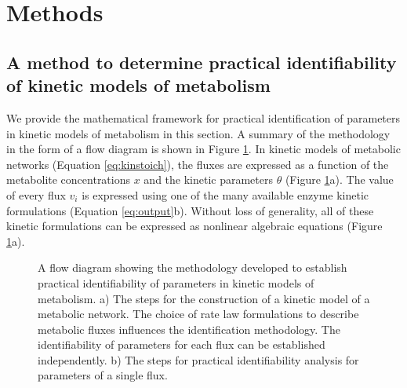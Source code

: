 \documentclass[10pt]{article}
\begin{document}
	\section{Methods}\label{sec:methods}
	\subsection{A method to determine practical identifiability of kinetic models of metabolism}\label{sec:ident}
	We provide the mathematical framework for practical identification of parameters in kinetic models of metabolism in this section. A summary of the methodology in the form of a flow diagram is shown in Figure \ref{fig:ident-flowchart}. In kinetic models of metabolic networks (Equation \ref{eq:kinstoich}), the fluxes are expressed as a function of the metabolite concentrations $x$ and the kinetic parameters $\theta$ (Figure \ref{fig:ident-flowchart}a). The value of every flux $v_i$ is expressed using one of the many available enzyme kinetic formulations (Equation \ref{eq:output}b). Without loss of generality, all of these kinetic formulations can be expressed as nonlinear algebraic equations (Figure \ref{fig:ident-flowchart}a). 
	
	\begin{figure}[!tbhp]
		\caption{A flow diagram showing the methodology developed to establish practical identifiability of parameters in kinetic models of metabolism. a) The steps for the construction of a kinetic model of a metabolic network. The choice of rate law formulations to describe metabolic fluxes influences the identification methodology. The identifiability of parameters for each flux can be established independently. b) The steps for practical identifiability analysis for parameters of a single flux.}\label{fig:ident-flowchart}
	\end{figure}	
	
\end{document}
